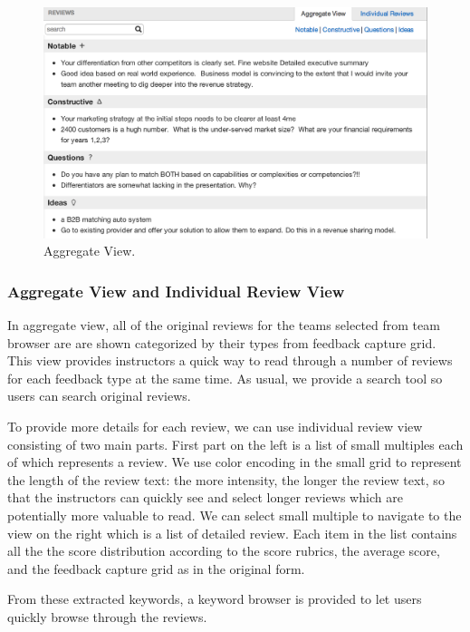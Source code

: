 \documentclass{sigchi}
\begin{document}
\begin{figure}[h]
\centering
\includegraphics[width=\columnwidth]{images/aggregate-view}
\caption{Aggregate View.}
\label{fig:aggregate-view}
\end{figure}

\subsubsection{Aggregate View and Individual Review View}

In aggregate view, all of the original reviews for the teams selected from team
browser are are shown categorized by their types from feedback capture grid.
This view provides instructors a quick way to read through a number of reviews
for each feedback type at the same time. As usual, we provide a search tool so
users can search original reviews.

To provide more details for each review, we can use individual review view
consisting of two main parts. First part on the left is a list of small
multiples each of which represents a review. We use color encoding in the small
grid to represent the length of the review text: the more intensity, the longer
the review text, so that the instructors can quickly see and select longer
reviews which are potentially more valuable to read. We can select small
multiple to navigate to the view on the right which is a list of detailed
review. Each item in the list contains all the the score distribution according
to the score rubrics, the average score, and the feedback capture grid as in the
original form.

From these extracted keywords, a keyword browser is provided to let users
quickly browse through the reviews.
\end{document}
